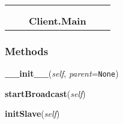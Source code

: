     \label{Client:Main}
\begin{tabular}{cccccc}
\multicolumn{2}{r}{\settowidth{\BCL}{??-1}\multirow{2}{\BCL}{??-1}}
&&
  \\\cline{3-3}
  &&\multicolumn{1}{c|}{}
&&
  \\
&&\multicolumn{2}{l}{\textbf{Client.Main}}
\end{tabular}



  \subsubsection{Methods}

    \label{Client:Main:__init__}

    \vspace{0.5ex}

\hspace{.8\funcindent}\begin{boxedminipage}{\funcwidth}

    \raggedright \textbf{\_\_init\_\_}(\textit{self}, \textit{parent}={\tt None})

\setlength{\parskip}{2ex}
\setlength{\parskip}{1ex}
    \end{boxedminipage}

    \label{Client:Main:startBroadcast}

    \vspace{0.5ex}

\hspace{.8\funcindent}\begin{boxedminipage}{\funcwidth}

    \raggedright \textbf{startBroadcast}(\textit{self})

\setlength{\parskip}{2ex}
\setlength{\parskip}{1ex}
    \end{boxedminipage}

    \label{Client:Main:initSlave}

    \vspace{0.5ex}

\hspace{.8\funcindent}\begin{boxedminipage}{\funcwidth}

    \raggedright \textbf{initSlave}(\textit{self})

\setlength{\parskip}{2ex}
\setlength{\parskip}{1ex}
    \end{boxedminipage}

